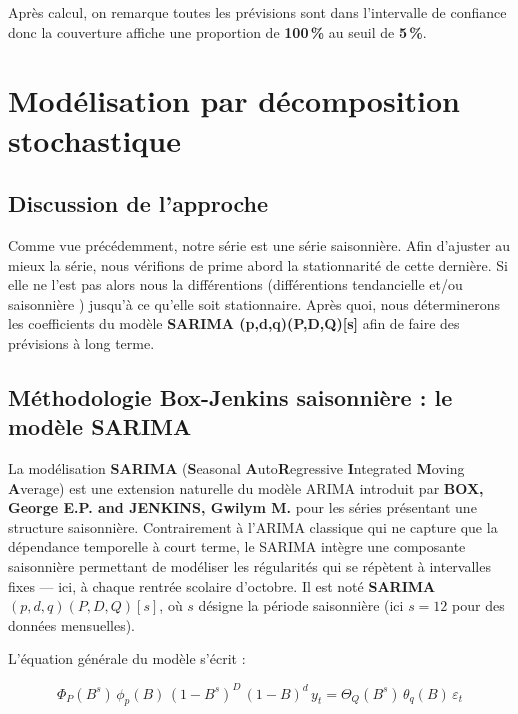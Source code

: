 \documentclass[
12pt,          %
a4paper,       %
oneside,       %
openright      %
]{report}
\begin{document}
 Après calcul, on remarque toutes les prévisions sont dans l'intervalle de confiance donc la couverture affiche une proportion de \textbf{100\,\%} au seuil de \textbf{5\,\%}.
 
 
 \chapter{Modélisation par décomposition stochastique}
 
 \section{ Discussion de l'approche}
 
 Comme vue précédemment, notre série est une série saisonnière. Afin d'ajuster au mieux la série, nous vérifions de prime abord la stationnarité de cette dernière. Si elle ne l'est pas alors nous la différentions (différentions  tendancielle et/ou  saisonnière ) jusqu'à ce qu'elle soit stationnaire. Après quoi, nous déterminerons les coefficients du modèle \textbf{SARIMA (p,d,q)(P,D,Q)[s]} afin de faire des prévisions à long terme.
 
 
 
 
 \section{Méthodologie Box-Jenkins saisonnière : le modèle SARIMA}
 
 La modélisation \textbf{SARIMA} (\textbf{S}easonal \textbf{A}uto\textbf{R}egressive 
 \textbf{I}ntegrated \textbf{M}oving \textbf{A}verage) est une extension naturelle du 
 modèle ARIMA introduit par \textbf{BOX, George E.P. and JENKINS, Gwilym M.} pour les séries présentant une structure 
 saisonnière. Contrairement à l'ARIMA classique qui ne capture que la dépendance 
 temporelle à court terme, le SARIMA intègre une composante saisonnière permettant 
 de modéliser les régularités qui se répètent à intervalles fixes --- ici, à chaque 
 rentrée scolaire d'octobre. Il est noté \textbf{SARIMA$(p,d,q)(P,D,Q)[s]$}, où $s$ 
 désigne la période saisonnière (ici $s = 12$ pour des données mensuelles).
 
 L'équation générale du modèle s'écrit :
 
 \begin{equation}
 	\Phi_P(B^s)\,\phi_p(B)\,(1 - B^s)^D\,(1 - B)^d\,y_t
 	= \Theta_Q(B^s)\,\theta_q(B)\,\varepsilon_t
 	\label{eq:sarima}
 \end{equation}
 
\end{document}
